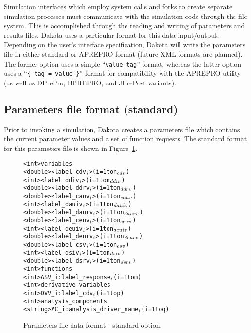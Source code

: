 Simulation interfaces which employ system calls and forks to create
separate simulation processes must communicate with the simulation
code through the file system. This is accomplished through the reading
and writing of parameters and results files. Dakota uses a particular
format for this data input/output. Depending on the user's interface
specification, Dakota will write the parameters file in either
standard or APREPRO format (future XML formats are planned). The
former option uses a simple ``\texttt{value tag}'' format, whereas the
latter option uses a ``\texttt{\{ tag = value \}}'' format for
compatibility with the APREPRO utility~\cite{Sja92} (as well as
DPrePro, BPREPRO, and JPrePost variants).

\subsection{Parameters file format (standard)}\label{variables:parameters:standard}

Prior to invoking a simulation, Dakota creates a parameters file which
contains the current parameter values and a set of function requests.
The standard format for this parameters file is shown in
Figure~\ref{variables:figure01}.

\begin{figure}
  \centering
  \begin{bigbox}
  \begin{alltt}
    <int>    variables
    <double> <label_cdv\(\sb{i}\)>         (i = 1 to n\(\sb{cdv}\))
    <int>    <label_ddiv\(\sb{i}\)>        (i = 1 to n\(\sb{ddiv}\))
    <double> <label_ddrv\(\sb{i}\)>        (i = 1 to n\(\sb{ddrv}\))
    <double> <label_cauv\(\sb{i}\)>        (i = 1 to n\(\sb{cauv}\))
    <int>    <label_dauiv\(\sb{i}\)>       (i = 1 to n\(\sb{dauiv}\))
    <double> <label_daurv\(\sb{i}\)>       (i = 1 to n\(\sb{daurv}\))
    <double> <label_ceuv\(\sb{i}\)>        (i = 1 to n\(\sb{ceuv}\))
    <int>    <label_deuiv\(\sb{i}\)>       (i = 1 to n\(\sb{deuiv}\))
    <double> <label_deurv\(\sb{i}\)>       (i = 1 to n\(\sb{deurv}\))
    <double> <label_csv\(\sb{i}\)>         (i = 1 to n\(\sb{csv}\))
    <int>    <label_dsiv\(\sb{i}\)>        (i = 1 to n\(\sb{dsiv}\))
    <double> <label_dsrv\(\sb{i}\)>        (i = 1 to n\(\sb{dsrv}\)) \color{blue}
    <int>    functions
    <int>    ASV_i:label_response\(\sb{i}\)       (i = 1 to m) \color{red}
    <int>    derivative_variables
    <int>    DVV_i:label_cdv\(\sb{i}\)            (i = 1 to p) \color{green}
    <int>    analysis_components
    <string> AC_i:analysis_driver_name\(\sb{i}\)  (i = 1 to q)
  \end{alltt}
  \end{bigbox}
  \caption{Parameters file data format - standard option.}
  \label{variables:figure01}
\end{figure}

